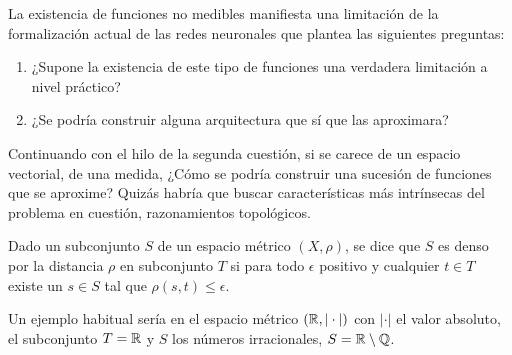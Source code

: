 La existencia de funciones no medibles manifiesta una limitación
de la formalización actual de las redes neuronales que plantea las siguientes 
preguntas: 
\begin{enumerate}
    \item ¿Supone la existencia de este tipo de funciones una verdadera limitación a nivel práctico?
    \item ¿Se podría construir alguna arquitectura que sí que las aproximara?
\end{enumerate}  

Continuando con el hilo de la segunda cuestión, si se carece de un espacio vectorial, 
de una medida,  ¿Cómo se podría construir una sucesión de funciones que se aproxime?
Quizás habría que buscar características más intrínsecas del problema en cuestión, 
razonamientos topológicos.

\begin{definicion} 
    \reversemarginpar 
    \setlength{\marginparwidth}{\smallMarginSize}
    \normalmarginpar
    Dado un subconjunto $S$ de un espacio métrico $(X, \rho)$, se dice que $S$ es denso por la distancia $\rho$
    en subconjunto $T$ si para todo $\epsilon$ positivo y cualquier $t \in T$ existe un $s \in S$ tal 
    que $\rho(s,t) \leq \epsilon$. 
\end{definicion}

Un ejemplo habitual sería en el espacio métrico $(\mathbb{R}, |\cdot|)$ con $|\cdot|$ el valor absoluto, el subconjunto 
$T = \mathbb{R}$ y $S$ los números irracionales, $S = \mathbb{R} \setminus \mathbb{Q}$. 


